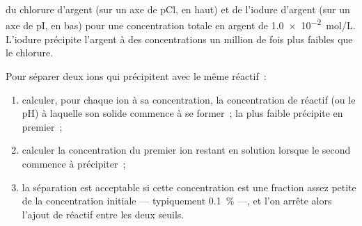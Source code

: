 \begin{omfigure}

{\small {} du chlorure d'argent (sur un axe de pCl, en
haut) et de l'iodure d'argent (sur un axe de pI, en bas) pour une
concentration totale en argent de \qty{1.0e-2}{mol/L}. L'iodure
précipite l'argent à des concentrations un million de fois plus faibles
que le chlorure.}
\end{omfigure}

\begin{method}\label{met:b1:precipitation:selective}
Pour séparer deux ions qui précipitent avec le même réactif~:
\begin{enumerate}
  \item calculer, pour chaque ion à sa concentration, la concentration de
        réactif (ou le pH) à laquelle son solide commence à se former~;
        la plus faible précipite en premier~;
  \item calculer la concentration du premier ion restant en solution
        lorsque le second commence à précipiter~;
  \item la séparation est acceptable si cette concentration est une
        fraction assez petite de la concentration initiale ---
        typiquement \qty{0.1}{\percent} ---, et l'on arrête alors l'ajout
        de réactif entre les deux seuils.
\end{enumerate}
\end{method}

